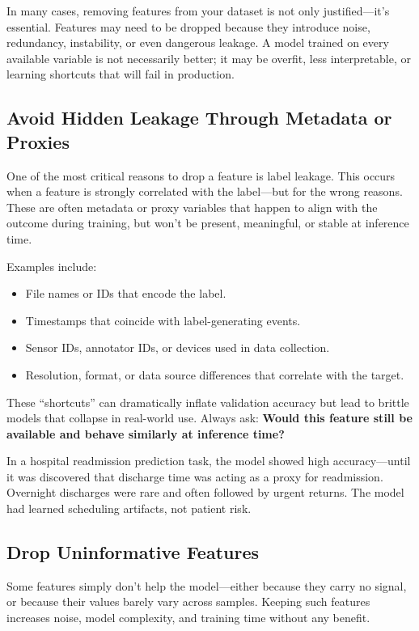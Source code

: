 \documentclass[12pt,openany]{book}
\begin{document}
In many cases, removing features from your dataset is not only justified—it’s essential. Features may need to be dropped because they introduce noise, redundancy, instability, or even dangerous leakage. A model trained on every available variable is not necessarily better; it may be overfit, less interpretable, or learning shortcuts that will fail in production.

\subsection{Avoid Hidden Leakage Through Metadata or Proxies}

One of the most critical reasons to drop a feature is label leakage. This occurs when a feature is strongly correlated with the label—but for the wrong reasons. These are often metadata or proxy variables that happen to align with the outcome during training, but won’t be present, meaningful, or stable at inference time.

Examples include:
\begin{itemize}
    \item File names or IDs that encode the label.
    \item Timestamps that coincide with label-generating events.
    \item Sensor IDs, annotator IDs, or devices used in data collection.
    \item Resolution, format, or data source differences that correlate with the target.
\end{itemize}

These “shortcuts” can dramatically inflate validation accuracy but lead to brittle models that collapse in real-world use. Always ask: \textbf{Would this feature still be available and behave similarly at inference time?}

\begin{examplebox}
In a hospital readmission prediction task, the model showed high accuracy—until it was discovered that discharge time was acting as a proxy for readmission. Overnight discharges were rare and often followed by urgent returns. The model had learned scheduling artifacts, not patient risk.
\end{examplebox}


\subsection{Drop Uninformative Features}

Some features simply don’t help the model—either because they carry no signal, or because their values barely vary across samples. Keeping such features increases noise, model complexity, and training time without any benefit.
\end{document}
